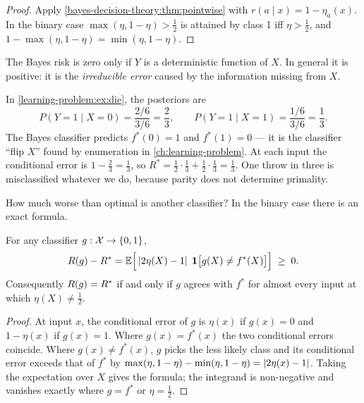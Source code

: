 \begin{notechapter}
\begin{proof}
Apply \cref{bayes-decision-theory:thm:pointwise} with
$r(a\mid x) = 1 - \eta_a(x)$. In the binary case
$\max(\eta, 1-\eta) > \frac12$ is attained by class 1 iff $\eta > \frac12$,
and $1 - \max(\eta, 1-\eta) = \min(\eta, 1-\eta)$.
\end{proof}

The Bayes risk is zero only if $Y$ is a deterministic function of $X$. In
general it is positive: it is the \emph{irreducible error} caused by the
information missing from $X$.

\begin{example}\label{bayes-decision-theory:ex:die}
In \cref{learning-problem:ex:die}, the posteriors are
\[
  P(Y=1 \mid X=0) = \frac{2/6}{3/6} = \frac23, \qquad
  P(Y=1 \mid X=1) = \frac{1/6}{3/6} = \frac13 .
\]
The Bayes classifier predicts $f^*(0) = 1$ and $f^*(1) = 0$ --- it is the
classifier ``flip $X$'' found by enumeration in \cref{ch:learning-problem}.
At each input the conditional error is $1 - \frac23 = \frac13$, so
$R^* = \frac12 \cdot \frac13 + \frac12 \cdot \frac13 = \frac13$. One throw in
three is misclassified whatever we do, because parity does not determine
primality.
\end{example}

How much worse than optimal is another classifier? In the binary case there is
an exact formula.

\begin{proposition}\label{bayes-decision-theory:prop:excess}
For any classifier $g : \mathcal{X} \to \{0,1\}$,
\[
  R(g) - R^* = \mathbb{E}\Bigl[\,\left|2\eta(X) - 1\right|\;\mathbf{1}\bigl[g(X) \neq f^*(X)\bigr]\Bigr] \;\geq\; 0 .
\]
Consequently $R(g) = R^*$ if and only if $g$ agrees with $f^*$ for almost
every input at which $\eta(X) \neq \frac12$.
\end{proposition}

\begin{proof}
At input $x$, the conditional error of $g$ is $\eta(x)$ if $g(x) = 0$ and
$1 - \eta(x)$ if $g(x) = 1$. Where $g(x) = f^*(x)$ the two conditional errors
coincide. Where $g(x) \neq f^*(x)$, $g$ picks the less likely class and its
conditional error exceeds that of $f^*$ by
$\max(\eta, 1 - \eta) - \min(\eta, 1-\eta) = \left|2\eta(x) - 1\right|$. Taking the
expectation over $X$ gives the formula; the integrand is non-negative and
vanishes exactly where $g = f^*$ or $\eta = \frac12$.
\end{proof}


\end{notechapter}
